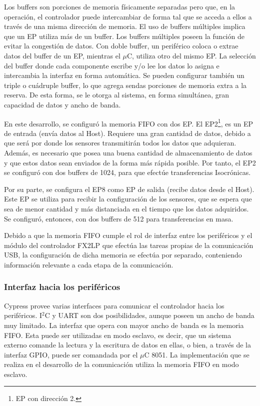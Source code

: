 	Los buffers son porciones de memoria físicamente separadas pero que, en la operación, el controlador puede intercambiar de forma tal que se acceda a ellos a través de una misma dirección de memoria. El uso de buffers múltiples implica que un EP utiliza más de un buffer. Los buffers múltiples poseen la función de evitar la congestión de datos. Con doble buffer, un periférico coloca o extrae datos del buffer de un EP, mientras el $\mu$C, utiliza otro del mismo EP. La selección del buffer donde cada componente escribe y/o lee los datos lo asigna e intercambia la interfaz en forma automática. Se pueden configurar también un triple o cuádruple buffer, lo que agrega sendas porciones de memoria extra a la reserva. De esta forma, se le otorga al sistema, en forma simultánea, gran capacidad de datos y ancho de banda.
	
	En este desarrollo, se configuró la memoria FIFO con dos EP. El EP2\footnote{EP con dirección 2.}, es un EP de entrada (envía datos al Host). Requiere una gran cantidad de datos, debido a que será por donde los sensores transmitirán todos los datos que adquieran. Además, es necesario que posea una buena cantidad de almacenamiento de datos y que estos datos sean enviados de la forma más rápida posible. Por tanto, el EP2 se configuró con dos buffers de \SI{1024}{\byte}, para que efectúe transferencias Isocrónicas.
	
	Por su parte, se configura el EP8 como EP de salida (recibe datos desde el Host). Este EP se utiliza para recibir la configuración de los sensores, que se espera que sea de menor cantidad y más distanciada en el tiempo que los datos adquiridos. Se configuró, entonces, con dos buffers de \SI{512}{\byte} para transferencias en masa.
	
	Debido a que la memoria FIFO cumple el rol de interfaz entre los periféricos y el módulo del controlador FX2LP que efectúa las tareas propias de la comunicación USB, la configuración de dicha memoria se efectúa por separado, conteniendo información relevante a cada etapa de la comunicación.
	
\subsubsection{Interfaz hacia los periféricos}
	Cypress provee varias interfaces para comunicar el controlador hacia los periféricos. I$^2$C y UART son dos posibilidades, aunque poseen un ancho de banda muy limitado. La interfaz que opera con mayor ancho de banda es la memoria FIFO. Esta puede ser utilizadas en modo esclavo, es decir, que un sistema externo comande la lectura y la escritura de datos en ellas, o bien, a través de la interfaz GPIO, puede ser comandada por el $\mu$C 8051. La implementación que se realiza en el desarrollo de la comunicación utiliza la memoria FIFO en modo esclavo.
	
